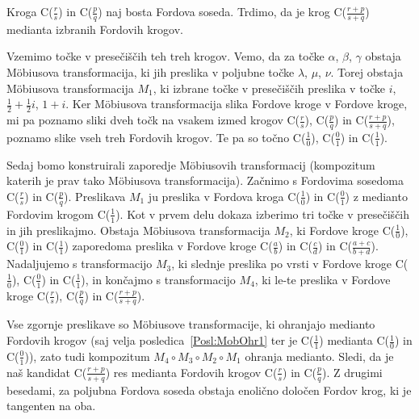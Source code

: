 \documentclass[mat1]{fmfdelo}
\begin{document}
\begin{dokaz}
Kroga C($\frac{r}{s}$) in C($\frac{p}{q}$) naj bosta Fordova soseda. Trdimo, da je krog C($\frac{r+p}{s+q}$) medianta izbranih Fordovih krogov.

Vzemimo točke v presečiščih teh treh krogov. Vemo, da za točke $\alpha$, $\beta$, $\gamma$ obstaja M\"{o}biusova transformacija, ki jih preslika v poljubne točke $\lambda$, $\mu$, $\nu$. Torej obstaja M\"{o}biusova transformacija $M_{1}$, ki izbrane točke v presečiščih preslika v točke $i$, $\frac{1}{2}+\frac{1}{2}i$, $1+i$. Ker M\"{o}biusova transformacija slika Fordove kroge v Fordove kroge, mi pa poznamo sliki dveh točk na vsakem izmed krogov C($\frac{r}{s}$), C($\frac{p}{q}$) in C($\frac{r+p}{s+q}$), poznamo slike vseh treh Fordovih krogov. Te pa so točno C($\frac{1}{0}$), C($\frac{0}{1}$) in C($\frac{1}{1}$).

Sedaj bomo konstruirali zaporedje M\"{o}biusovih transformacij (kompozitum katerih je prav tako M\"{o}biusova transformacija). Začnimo s Fordovima sosedoma C($\frac{r}{s}$) in C($\frac{p}{q}$). Preslikava $M_{1}$ ju preslika v Fordova kroga C($\frac{1}{0}$) in C($\frac{0}{1}$) z medianto Fordovim krogom C($\frac{1}{1}$). Kot v prvem delu dokaza izberimo tri točke v presečiščih in jih preslikajmo. Obstaja M\"{o}biusova transformacija $M_{2}$, ki Fordove kroge C($\frac{1}{0}$), C($\frac{0}{1}$) in C($\frac{1}{1}$) zaporedoma preslika v Fordove kroge C($\frac{a}{b}$) in C($\frac{c}{d}$) in C($\frac{a+c}{b+d}$). Nadaljujemo s transformacijo $M_{3}$, ki slednje preslika po vrsti v Fordove kroge C($\frac{1}{0}$), C($\frac{0}{1}$) in C($\frac{1}{1}$), in končajmo s transformacijo $M_{4}$, ki le-te preslika v Fordove kroge C($\frac{r}{s}$), C($\frac{p}{q}$) in C($\frac{r+p}{s+q}$).

Vse zgornje preslikave so M\"{o}biusove transformacije, ki ohranjajo medianto Fordovih krogov (saj velja posledica~\ref{Posl:MobOhr1} ter je C($\frac{1}{1}$) medianta C($\frac{1}{0}$) in C($\frac{0}{1}$)), zato tudi kompozitum $M_{4} \circ M_{3} \circ M_{2} \circ M_{1}$ ohranja medianto. Sledi, da je naš kandidat C($\frac{r+p}{s+q}$) res medianta Fordovih krogov C($\frac{r}{s}$) in C($\frac{p}{q}$). Z drugimi besedami, za poljubna Fordova soseda obstaja enolično določen Fordov krog, ki je tangenten na oba.
\end{dokaz}

%
\end{document}

